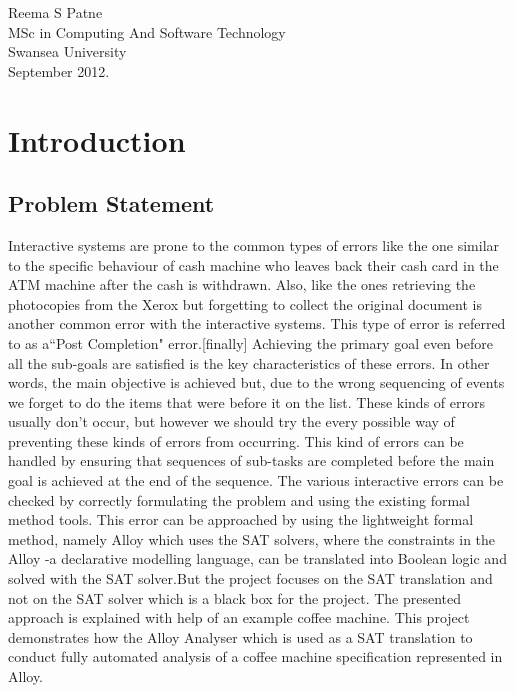 \documentclass[a4paper,12pt]{extarticle}
\begin{document}
\begin{flushright}
Reema S Patne\\
MSc in Computing And Software Technology\\
Swansea University\\
September 2012.
\end{flushright}

\newpage 
\tableofcontents
\maketitle
\newpage
\section{Introduction}
\label{Intro}
\subsection{Problem Statement}
\label{prob stat}
Interactive systems are prone to the common types of errors like the one similar to the specific behaviour of cash machine who leaves back their cash card in the ATM machine after the cash is withdrawn. Also, like the ones retrieving the photocopies from the Xerox but forgetting to collect the original document is another common error with the interactive systems. This type of error is referred to as a``Post Completion" error.[finally] Achieving the primary goal even before all the sub-goals are satisfied is the key characteristics of these errors. In other words, the main objective is achieved but, due to the wrong sequencing of events we forget to do the items that were before it on the list. These kinds of errors usually don't occur, but however we should try the every possible way of preventing these kinds of errors from occurring. This kind of errors can be handled by ensuring that sequences of sub-tasks are completed before the main goal is achieved at the end of the sequence. The various interactive errors can be checked by correctly formulating the problem and using the existing formal method tools. This error can be approached by using the lightweight formal method, namely Alloy which uses the SAT solvers, where the constraints in the Alloy -a declarative modelling language, can be translated into Boolean logic and solved with the SAT solver.But the project focuses on the SAT translation and not on the  SAT solver which is a black box for the project. The presented approach is explained with help of an example coffee machine. This project demonstrates how the Alloy Analyser which is used as a SAT translation to conduct fully automated analysis of a coffee machine specification represented in Alloy. \\
\end{document}
